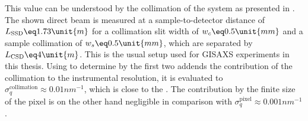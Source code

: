\documentclass[\main/dresen_thesis.tex]{subfiles}
\begin{document}
    This value can be understood by the collimation of the system as presented in .
    The shown direct beam is measured at a sample-to-detector distance of $L_\mathrm{SSD} \eq 1.73 \unit{m}$ for a collimation slit width of $w_c \eq 0.5 \unit{mm}$ and a sample collimation of $w_s \eq 0.5 \unit{mm}$, which are separated by $L_\mathrm{CSD} \eq 4 \unit{m}$.
    This is the usual setup used for GISAXS experiments in this thesis.
    Using  to determine by the first two addends the contribution of the collimation to the instrumental resolution, it is evaluated to $\sigma_q^\mathrm{collimation} \approx 0.01 nm^{-1}$, which is close to the .
    The contribution by the finite size of the pixel is on the other hand negligible in comparison with $\sigma_q^\mathrm{pixel} \approx 0.001 nm^{-1}$.
\end{document}
